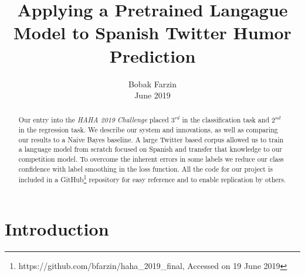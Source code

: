 \documentclass[runningheads]{llncs}
\begin{document}
\title{Applying a Pretrained Langague Model to Spanish Twitter Humor Prediction}
\author{Bobak Farzin \\June 2019}
%
%


\maketitle

\begin{abstract}
Our entry into the \textit{HAHA 2019 Challenge} placed $3^{rd}$ in the classification task and $2^{nd}$ in the regression task.  We describe our system and innovations, as well as comparing our results to a Naive Bayes baseline.
A large Twitter based corpus allowed us to train a language model from scratch focused on Spanish and transfer that knowledge to our competition model.  To overcome the inherent errors in some labels we reduce our class confidence with label smoothing in the loss function.
All the code for our project is included in a GitHub\footnote{https://github.com/bfarzin/haha\_2019\_final, Accessed on 19 June 2019} repository for easy reference and to enable replication by others.

\end{abstract}

\section{Introduction}
\label{intro}
\newcommand{\chapquote}[3]{\begin{quotation} \textit{#1} \end{quotation} \begin{flushright} - #2, \textit{#3}\end{flushright} }
\end{document}
